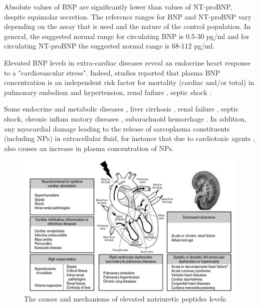 \documentclass[14pt,a4paper,onecolumn]{extarticle}
\begin{document}
Absolute values of BNP are significantly lower than values of NT-proBNP, despite equimolar secretion. The reference ranges for BNP and NT-proBNP vary depending on the assay that is used and the nature of the control population. In general, the suggested normal range for circulating BNP is 0.5-30 pg/ml and for circulating NT-proBNP the suggested normal range is 68-112 pg/ml. \citep{Cowie2003} %

Elevated BNP levels in extra-cardiac diseases reveal an endocrine heart response to a "cardiovascular stress". Indeed,  studies reported that plasma BNP concentration is an independent risk factor for mortality (cardiac and/or total) in pulmonary embolism \citep{121} \citep{123} \citep{bib382} and hypertension, renal failure \citep{28} \citep{100} \citep{144}, septic shock \citep{145}. %

Some endocrine and metabolic diseases \citep{141}, liver cirrhosis \citep{142} \citep{143} \citep{144}, renal failure \citep{100} \citep{144}, septic shock, chronic inflam matory diseases \citep{145} \citep{146} \citep{61} \citep{149}, subarachnoid hemorrhage \citep{150} \citep{153}. In addition, any myocardial damage leading to the release of sarcoplasma constituents (including NPs) in extracellular fluid, for instance that due to cardiotoxic agents \citep{157} \citep{161}, also causes an increase in plasma concentration of NPs. %

\begin{figure}      \centering      \includegraphics[scale=0.3]{../../images/NP_causes.png}      \small\caption{The causes and mechanisms of elevated natriuretic peptides levels.}      \label{NP_causes}  \end{figure} %
\end{document}
